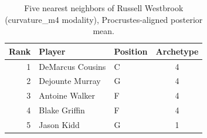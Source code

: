 \begin{table}[htbp]
  \centering\small
  \begin{tabular}{rllc}
    \toprule
    Rank & Player & Position & Archetype \\
    \midrule
    1 & DeMarcus Cousins & C & 4 \\
    2 & Dejounte Murray & G & 4 \\
    3 & Antoine Walker & F & 4 \\
    4 & Blake Griffin & F & 4 \\
    5 & Jason Kidd & G & 1 \\
    \bottomrule
  \end{tabular}
  \caption{Five nearest neighbors of Russell Westbrook (curvature_m4 modality), Procrustes-aligned posterior mean.}
  \label{tab:Russell_Westbrook_neighbors_curvature_m4}
\end{table}

